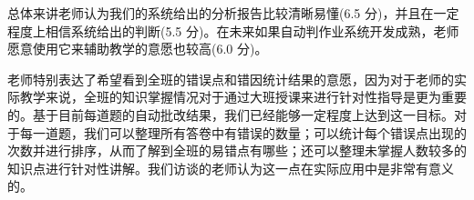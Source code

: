 总体来讲老师认为我们的系统给出的分析报告比较清晰易懂(6.5 分)，并且在一定程度上相信系统给出的判断(5.5 分)。在未来如果自动判作业系统开发成熟，老师愿意使用它来辅助教学的意愿也较高(6.0 分)。

老师特别表达了希望看到全班的错误点和错因统计结果的意愿，因为对于老师的实际教学来说，全班的知识掌握情况对于通过大班授课来进行针对性指导是更为重要的。基于目前每道题的自动批改结果，我们已经能够一定程度上达到这一目标。对于每一道题，我们可以整理所有答卷中有错误的数量；可以统计每个错误点出现的次数并进行排序，从而了解到全班的易错点有哪些；还可以整理未掌握人数较多的知识点进行针对性讲解。我们访谈的老师认为这一点在实际应用中是非常有意义的。

